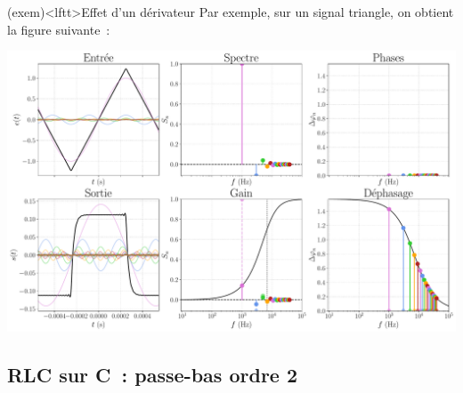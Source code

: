 \documentclass[../../main/main.tex]{subfiles}
\begin{document}
\begin{tcb*}[breakable](exem)<lftt>{Effet d'un dérivateur}
	Par exemple, sur un signal triangle, on obtient la figure suivante~:
	\begin{center}
		\includegraphics[width=.95\linewidth]{fft_trgl_bth_PH-fe=1000-fc=7000}
		\label{fig:trglPH}
	\end{center}
\end{tcb*}

\subsection{RLC sur C~: passe-bas ordre 2}
\vspace{-15pt}
\begin{center}
	\vspace{-15pt}
\end{center}
\end{document}
